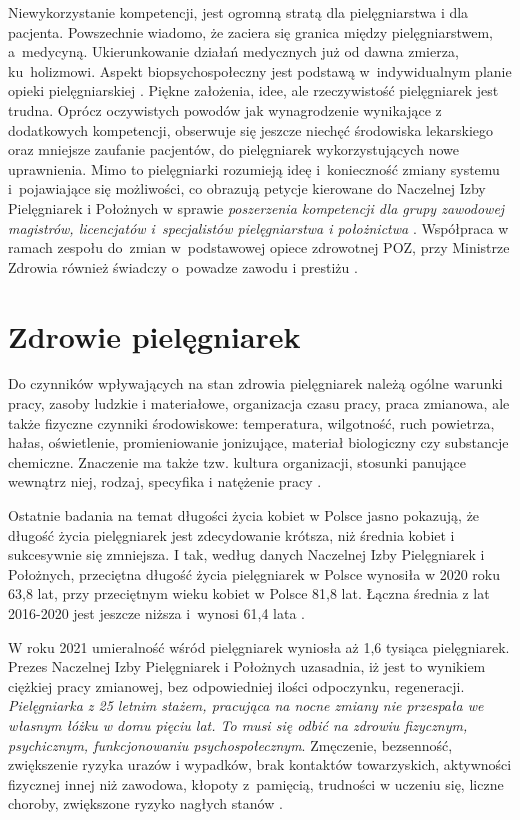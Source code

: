 \documentclass[a4paper,12pt,twoside,openright]{mwrep}
\begin{document}
Niewykorzystanie  kompetencji, jest ogromną stratą dla pielęgniarstwa i dla pacjenta. Powszechnie wiadomo, że zaciera się granica między pielęgniarstwem, a~medycyną. Ukierunkowanie działań medycznych już od dawna zmierza, ku~holizmowi. Aspekt biopsychospołeczny jest podstawą w~indywidualnym planie opieki pielęgniarskiej \cite{dorota}. Piękne założenia, idee, ale rzeczywistość pielęgniarek jest trudna. Oprócz oczywistych powodów jak wynagrodzenie wynikające z dodatkowych kompetencji, obserwuje się jeszcze niechęć środowiska lekarskiego oraz mniejsze zaufanie pacjentów, do pielęgniarek wykorzystujących nowe uprawnienia. Mimo to pielęgniarki rozumieją ideę i~konieczność zmiany systemu i~pojawiające się możliwości, co obrazują petycje kierowane do Naczelnej Izby Pielęgniarek i Położnych w sprawie \textit{poszerzenia kompetencji dla grupy zawodowej magistrów, licencjatów i~specjalistów pielęgniarstwa i położnictwa} \cite{petycja}. Współpraca w ramach zespołu do~zmian w~podstawowej opiece zdrowotnej POZ, przy Ministrze Zdrowia również świadczy o~powadze zawodu i prestiżu \cite{poz}.

\section{Zdrowie pielęgniarek}
\label{sectionZdrowiePielegniarek}
Do czynników wpływających na stan zdrowia pielęgniarek należą ogólne warunki pracy, zasoby ludzkie i materiałowe, organizacja czasu pracy,  praca zmianowa, ale także fizyczne czynniki środowiskowe: temperatura, wilgotność, ruch powietrza, hałas, oświetlenie, promieniowanie jonizujące, materiał biologiczny czy substancje chemiczne. Znaczenie ma także tzw. kultura organizacji, stosunki panujące wewnątrz niej, rodzaj, specyfika i natężenie pracy \cite{obciazenia}.

Ostatnie badania na temat długości życia kobiet w Polsce jasno pokazują, że długość życia pielęgniarek jest zdecydowanie krótsza, niż średnia kobiet i sukcesywnie się zmniejsza. I tak, według danych Naczelnej Izby Pielęgniarek i Położnych, przeciętna długość życia pielęgniarek w Polsce wynosiła w 2020 roku 63,8 lat, przy przeciętnym wieku kobiet w Polsce 81,8 lat. Łączna średnia z lat 2016-2020 jest jeszcze niższa i~wynosi 61,4 lata \cite{statystyka}.

W roku 2021 umieralność wśród pielęgniarek wyniosła aż 1,6 tysiąca pielęgniarek. Prezes Naczelnej Izby Pielęgniarek i Położnych uzasadnia, iż jest to wynikiem ciężkiej pracy zmianowej, bez odpowiedniej ilości odpoczynku, regeneracji.\textit{ Pielęgniarka z 25 letnim stażem, pracująca na nocne zmiany nie przespała we własnym łóżku w domu pięciu lat. To musi się odbić na zdrowiu fizycznym, psychicznym, funkcjonowaniu psychospołecznym}. Zmęczenie, bezsenność, zwiększenie ryzyka urazów i wypadków, brak kontaktów towarzyskich, aktywności fizycznej innej niż zawodowa, kłopoty z~pamięcią, trudności w uczeniu się, liczne choroby, zwiększone ryzyko nagłych stanów \cite{zgony}.
\end{document}
